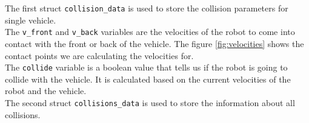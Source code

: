         The first struct \texttt{collision\_data} is used to store the collision parameters for single vehicle.\\
        The \texttt{v\_front} and \texttt{v\_back} variables are the velocities of the robot to come into contact with the front or back of the vehicle. The figure \ref{fig:velocities} shows the contact points we are calculating the velocities for.\\
        The \texttt{collide} variable is a boolean value that tells us if the robot is going to collide with the vehicle. It is calculated based on the current velocities of the robot and the vehicle.\\
        The second struct \texttt{collisions\_data} is used to store the information about all collisions.\\\\
